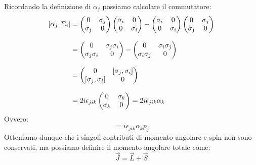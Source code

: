 Ricordando la definizione di $\alpha_j$ possiamo calcolare il commutatore:
\begin{equation}
  \begin{split}
    \left[\alpha_j, \Sigma_i\right] &=
    \begin{pmatrix}
      0 & \sigma_j \\
      \sigma_j & 0
    \end{pmatrix}
    \begin{pmatrix}
      \sigma_i & 0 \\
      0 & \sigma_i
    \end{pmatrix} -
    \begin{pmatrix}
      \sigma_i & 0 \\
      0 & \sigma_i
    \end{pmatrix}
    \begin{pmatrix}
      0 & \sigma_j \\
      \sigma_j & 0
    \end{pmatrix} \\[8pt]
    &=
    \begin{pmatrix}
      0 & \sigma_j\sigma_i \\
      \sigma_j\sigma_i & 0
    \end{pmatrix} -
    \begin{pmatrix}
      0 & \sigma_i\sigma_j \\
      \sigma_i\sigma_j & 0
    \end{pmatrix} \\[8pt]
    &=
    \begin{pmatrix}
      0 & [\sigma_j, \sigma_i] \\
      [\sigma_j, \sigma_i] & 0
    \end{pmatrix} \\[8pt]
    &= 2i\epsilon_{jik}
    \begin{pmatrix}
      0 & \sigma_k \\
      \sigma_k & 0
    \end{pmatrix} = 2i\epsilon_{jik} \alpha_k
  \end{split}
\end{equation}
Ovvero:
\begin{equation}
  [H, S_i] = i \epsilon_{jik} \alpha_k p_j
\end{equation}
Otteniamo dunque che i singoli contributi di momento angolare e spin non sono conservati, ma possiamo definire il momento angolare totale come:
\begin{equation}
  \vec{J} = \vec{L} + \vec{S}
\end{equation}
